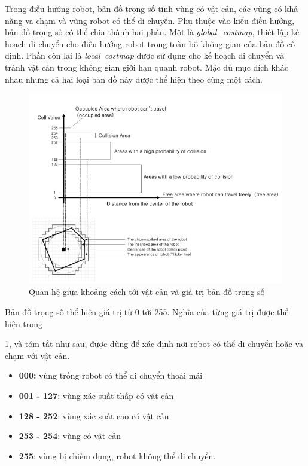 {Trong điều hướng robot, bản đồ trọng số tính vùng có vật cản, các vùng có khả năng va chạm và vùng robot có thể di chuyển. Phụ thuộc vào kiểu điều hướng, bản đồ trọng số có thể chia thành hai phần. Một là \textit{global\_costmap}, thiết lập kế hoạch di chuyển cho điều hướng robot trong toàn bộ không gian của bản đồ cố định. Phần còn lại là \textit{local\ costmap} được sử dụng cho kế hoạch di chuyển và tránh vật cản trong không gian giới hạn quanh robot. Mặc dù mục đích khác nhau nhưng cả hai loại bản đồ này được thể hiện theo cùng một cách.

\begin{figure}[htbp]
  \centering
  \includegraphics[width=0.8\linewidth]{figures/relationship-distanceToObstacle-vs-costmapValue.png}
  \caption{Quan hệ giữa khoảng cách tới vật cản và giá trị bản đồ trọng số}
  \label{fig:relationship-distanceToObstacle-vs-costmapValue}
\end{figure}

Bản đồ trọng số thể hiện giá trị từ 0 tới 255. Nghĩa của từng giá trị được thể hiện trong \figurename{ \ref{fig:relationship-distanceToObstacle-vs-costmapValue}, và tóm tắt như sau, được dùng để xác định nơi robot có thể di chuyển hoặc va chạm với vật cản.

\begin{itemize}
  \item \textbf{000:} vùng trống robot có thể di chuyển thoải mái
  \item \textbf{001 - 127}: vùng xác suất thấp có vật cản
  \item \textbf{128 - 252}: vùng xác suất cao có vật cản
  \item \textbf{253 - 254}: vùng có vật cản
  \item \textbf{255}: vùng bị chiếm dụng, robot không thể di chuyển.
\end{itemize}

}}
